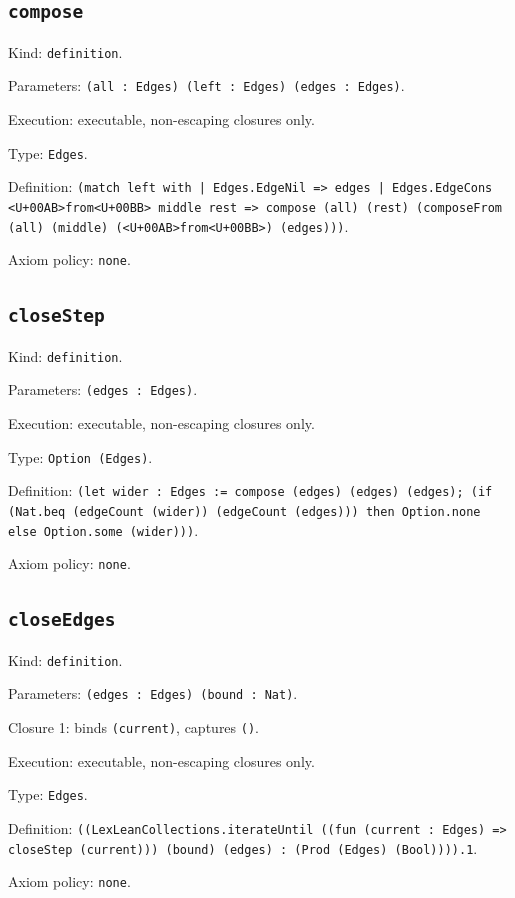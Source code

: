 \documentclass[11pt]{article}
\begin{document}
\subsection*{\texttt{compose}}
\noindent Kind: \texttt{definition}.\par
\noindent Parameters: \texttt{(all : Edges) (left : Edges) (edges : Edges)}.\par
\noindent Execution: executable, non-escaping closures only.\par
\noindent Type: \texttt{Edges}.\par
\noindent Definition: \texttt{(match left with | Edges.EdgeNil => edges | Edges.EdgeCons <U+00AB>from<U+00BB> middle rest => compose (all) (rest) (composeFrom (all) (middle) (<U+00AB>from<U+00BB>) (edges)))}.\par
\noindent Axiom policy: \texttt{none}.\par
\subsection*{\texttt{closeStep}}
\noindent Kind: \texttt{definition}.\par
\noindent Parameters: \texttt{(edges : Edges)}.\par
\noindent Execution: executable, non-escaping closures only.\par
\noindent Type: \texttt{Option (Edges)}.\par
\noindent Definition: \texttt{(let wider : Edges := compose (edges) (edges) (edges); (if (Nat.beq (edgeCount (wider)) (edgeCount (edges))) then Option.none else Option.some (wider)))}.\par
\noindent Axiom policy: \texttt{none}.\par
\subsection*{\texttt{closeEdges}}
\noindent Kind: \texttt{definition}.\par
\noindent Parameters: \texttt{(edges : Edges) (bound : Nat)}.\par
\noindent Closure 1: binds \texttt{(current)}, captures \texttt{()}.\par
\noindent Execution: executable, non-escaping closures only.\par
\noindent Type: \texttt{Edges}.\par
\noindent Definition: \texttt{((LexLeanCollections.iterateUntil ((fun (current : Edges) => closeStep (current))) (bound) (edges) : (Prod (Edges) (Bool)))).1}.\par
\noindent Axiom policy: \texttt{none}.\par
\end{document}
